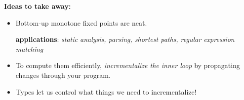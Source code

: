 \documentclass[aspectratio=169,dvipsnames]{beamer}
\providecommand\strong[1]{{\bfseries#1}}
\begin{document}

  \begin{frame}
    \strong{Ideas to take away:}\vspace{1ex}
    \begin{itemize}
    \item Bottom-up monotone fixed points are neat.

      {\normalsize \textbf{applications}: \itshape static analysis, parsing,
        shortest paths, regular expression matching}

    \item To compute them efficiently, \emph{incrementalize the inner loop} by
      propagating changes through your program.

    \item Types let us control what things we need to incrementalize!
    \end{itemize}
    \vspace{\baselineskip}
  \end{frame}
\end{document}

